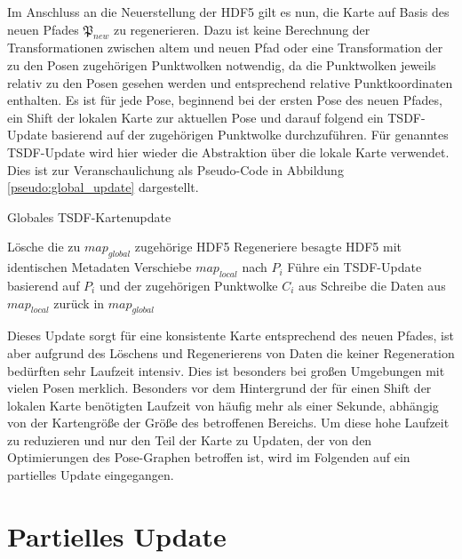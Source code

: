 
Im Anschluss an die Neuerstellung der HDF5 gilt es nun, die Karte auf Basis des neuen Pfades $\mathfrak{P}_{new}$ zu regenerieren. Dazu ist keine Berechnung der Transformationen zwischen altem und neuen Pfad oder eine Transformation der zu den Posen zugehörigen Punktwolken notwendig, da die Punktwolken jeweils relativ zu den Posen gesehen werden und entsprechend relative Punktkoordinaten enthalten. Es ist für jede Pose, beginnend bei der ersten Pose des neuen Pfades, ein Shift der lokalen Karte zur aktuellen Pose und darauf folgend ein TSDF-Update basierend auf der zugehörigen Punktwolke durchzuführen. Für genanntes TSDF-Update wird hier wieder die Abstraktion über die lokale Karte verwendet. Dies ist zur Veranschaulichung als Pseudo-Code in Abbildung \ref{pseudo:global_update} dargestellt.

\begin{algorithm}[H]
\caption{Globales TSDF-Kartenupdate} \label{pseudo:global_update}
\begin{algorithmic}[1]
	\State Lösche die zu $map_{global}$ zugehörige HDF5
	\State Regeneriere besagte HDF5 mit identischen Metadaten
		\State Verschiebe $map_{local}$ nach $P_i$
		\State Führe ein TSDF-Update basierend auf $P_i$ und der zugehörigen Punktwolke $C_i$ aus
		\State Schreibe die Daten aus $map_{local}$ zurück in $map_{global}$
	\EndFor
\EndProcedure
\end{algorithmic}
\end{algorithm}

Dieses Update sorgt für eine konsistente Karte entsprechend des neuen Pfades, ist aber aufgrund des Löschens und Regenerierens von Daten die keiner Regeneration bedürften sehr Laufzeit intensiv. Dies ist besonders bei großen Umgebungen mit vielen Posen merklich. Besonders vor dem Hintergrund der für einen Shift der lokalen Karte benötigten Laufzeit von häufig mehr als einer Sekunde, abhängig von der Kartengröße der Größe des betroffenen Bereichs. Um diese hohe Laufzeit zu reduzieren und nur den Teil der Karte zu Updaten, der von den Optimierungen des Pose-Graphen betroffen ist, wird im Folgenden auf ein partielles Update eingegangen. 


\section{Partielles Update}
\label{section:partial_update}

